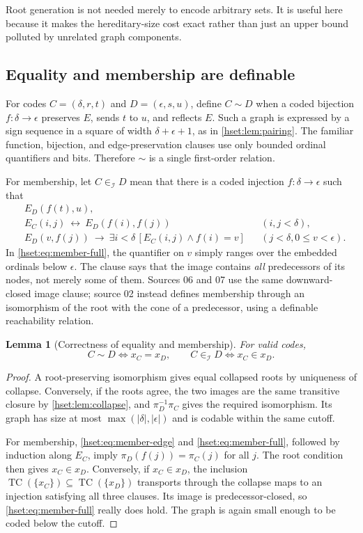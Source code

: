 \documentclass[11pt,letterpaper]{article}
\newtheorem{lemma}[lemma]{Lemma}\aliascntresetthe{lemma}
\theoremstyle{definition}
\theoremstyle{remark}
\newcommand{\TC}{\operatorname{TC}}
\newcommand{\I}{\mathcal I}
\newcommand{\card}[1]{\lvert#1\rvert}
\begin{document}
Root generation is not needed merely to encode arbitrary sets. It is useful
here because it makes the hereditary-size cost exact rather than just an
upper bound polluted by unrelated graph components.

\subsection{Equality and membership are definable}

For codes $C=(\delta,r,t)$ and $D=(\epsilon,s,u)$, define $C\sim D$ when a
coded bijection $f:\delta\to\epsilon$ preserves $E$, sends $t$ to $u$, and
reflects $E$. Such a graph is expressed by a sign sequence in a square of
width $\delta+\epsilon+1$, as in \cref{hset:lem:pairing}. The familiar function,
bijection, and edge-preservation clauses use only bounded ordinal
quantifiers and bits. Therefore $\sim$ is a single first-order relation.

For membership, let $C\in_\I D$ mean that there is a coded injection
$f:\delta\to\epsilon$ such that
\begin{align}
 &E_D(f(t),u),\label{hset:eq:member-root}\\
 &E_C(i,j)\ \longleftrightarrow\ E_D(f(i),f(j))
       &&(i,j<\delta),\label{hset:eq:member-edge}\\
 &E_D(v,f(j))\ \longrightarrow\
       \exists i<\delta\,[E_C(i,j)\land f(i)=v]
       &&(j<\delta,0\le v<\epsilon).\label{hset:eq:member-full}
\end{align}
In \eqref{hset:eq:member-full}, the quantifier on $v$ simply ranges over the
embedded ordinals below $\epsilon$. The clause says that the image contains
\emph{all} predecessors of its nodes, not merely some of them. Sources 06 and
07 use the same downward-closed image clause; source 02 instead defines
membership through an isomorphism of the root with the cone of a predecessor,
using a definable reachability relation.

\begin{lemma}[Correctness of equality and membership]
\label{hset:lem:equal-member}
For valid codes,
\[
 C\sim D\iff x_C=x_D,
 \qquad
 C\in_\I D\iff x_C\in x_D.
\]
\end{lemma}
\begin{proof}
A root-preserving isomorphism gives equal collapsed roots by uniqueness of
collapse. Conversely, if the roots agree, the two images are the same
transitive closure by \cref{hset:lem:collapse}, and
$\pi_D^{-1}\pi_C$ gives the required isomorphism. Its graph has size at most
$\max(\card\delta,\card\epsilon)$ and is codable within the same cutoff.

For membership, \eqref{hset:eq:member-edge} and \eqref{hset:eq:member-full},
followed by induction along $E_C$, imply $\pi_D(f(j))=\pi_C(j)$ for all $j$.
The root condition then gives $x_C\in x_D$. Conversely, if $x_C\in x_D$, the
inclusion $\TC(\{x_C\})\subseteq\TC(\{x_D\})$ transports through the collapse
maps to an injection satisfying all three clauses. Its image is
predecessor-closed, so \eqref{hset:eq:member-full} really does hold. The graph
is again small enough to be coded below the cutoff.
\end{proof}
\end{document}

